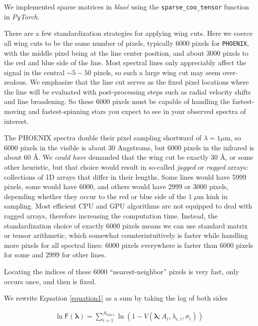 \documentclass[modern]{aastex631}
\begin{document}
We implemented sparse matrices in \emph{blas\'e} using the \texttt{sparse\_coo\_tensor} function in \emph{PyTorch}.

There are a few standardization strategies for applying wing cuts. Here we coerce all wing cuts to be the same number of pixels, typically 6000 pixels for \texttt{PHOENIX}, with the middle pixel being at the line center position, and about 3000 pixels to the red and blue side of the line. Most spectral lines only appreciably affect the signal in the central $\sim5-50$ pixels, so such a large wing cut may seem over-zealous. We emphasize that the line cut serves as the fixed pixel locations where the line will be evaluated with post-processing steps such as radial velocity shifts and line broadening. So these 6000 pixels must be capable of handling the fastest-moving and fastest-spinning stars you expect to see in your observed spectra of interest.

The PHOENIX spectra double their pixel sampling shortward of $\lambda = 1 \mu$m, so 6000 pixels in the visible is about 30 Angstroms, but 6000 pixels in the infrared is about 60 \AA. We \emph{could have} demanded that the wing cut be exactly 30 \AA, or some other heuristic, but that choice would result in so-called \emph{jagged} or \emph{ragged} arrays: collections of 1D arrays that differ in their lengths. Some lines would have 5999 pixels, some would have 6000, and others would have 2999 or 3000 pixels, depending whether they occur to the red or blue side of the $1 \;\mu$m kink in sampling. Most efficient CPU and GPU algorithms are not equipped to deal with ragged arrays, therefore increasing the computation time. Instead, the standardization choice of exactly 6000 pixels means we can use standard matrix or tensor arithmetic, which somewhat counterintuitively is faster while handling more pixels for all spectral lines: 6000 pixels everywhere is faster than 6000 pixels for some and 2999 for other lines.

Locating the indices of these 6000 ``nearest-neighbor'' pixels is very fast, only occurs once, and then is fixed.

We rewrite Equation \ref{equation1} as a sum by taking the log of both sides

\begin{eqnarray}
 \ln{\mathsf{F}(\bm{\lambda})} = \sum_{i=1}^{N_{lines}} \ln{\left(1-V(\bm{\lambda};A_i, \lambda_{c,i}, \sigma_i) \right)}
\end{eqnarray}
\end{document}
